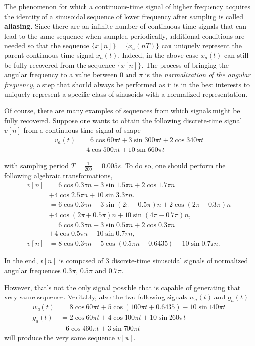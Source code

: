 \documentclass[\documentfontsize, twocolumn]{\classname}
\begin{document}
The phenomenon for which a con\-ti\-nuo\-us-time signal of high\-er frequency acquires the identity of a sinusoidal se\-quen\-ce of lower frequency after sampling is called \textbf{aliasing}. Since there are an infinite number of con\-ti\-nuo\-us-time signals that can lead to the same se\-quen\-ce when sampled periodically, additional conditions are needed so that the se\-quen\-ce $\{x[n]\} = \{x_a(nT)\}$ can uniquely represent the parent con\-ti\-nuo\-us-time signal $x_a(t)$. Indeed, in the above case $x_a(t)$ can still be fully recovered from the se\-quen\-ce $\{x[n]\}$. The process of bringing the angular frequency to a value between $0$ and $\pi$ is the \emph{normalization of the angular frequency}, a step that should always be performed as it is in the best interests to uniquely represent a specific class of sinusoids with a normalized representation.

Of course, there are many examples of se\-quen\-ces from which signals might be fully recovered. Suppose one wants to obtain the following discrete-time signal $v[n]$ from a con\-ti\-nuo\-us-time signal of shape 
\begin{align*}
v_a(t) &=6\cos{60\pi t} + 3\sin{300\pi t} + 2\cos{340\pi t} \\ & + 4\cos{500\pi t} + 10\sin{660\pi t}
\end{align*}

with sampling period $T = \frac 1 {200} = 0.005s$.
To do so, one should perform the following algebraic transformations,
\begin{align*}
    v[n] &= 6 \cos{0.3 \pi n} + 3 \sin{1.5 \pi n} + 2 \cos{1.7 \pi n} \\
         &+ 4 \cos{2.5 \pi n} + 10 \sin{3.3 \pi n},\\
         &= 6 \cos{0.3 \pi n} + 3 \sin{(2\pi -0.5 \pi) n} + 2 \cos{(2\pi - 0.3\pi)n} \\
         &+ 4 \cos{(2 \pi + 0.5\pi) n} + 10 \sin{(4 \pi - 0.7\pi) n},\\
         &= 6 \cos{0.3 \pi n} - 3 \sin{0.5 \pi n} + 2 \cos{0.3\pi n} \\
         &+ 4 \cos{0.5\pi n} - 10 \sin{0.7\pi n},\\
    v[n] &= 8 \cos{0.3 \pi n} + 5 \cos{(0.5 \pi n + 0.6435)} - 10 \sin{0.7\pi n}.
\end{align*}

In the end, $v[n]$ is composed of 3 discrete-time sinusoidal signals of normalized angular frequences $0.3\pi$, $0.5\pi$ and $0.7\pi$.

However, that's not the only signal possible that is capable of generating that very same sequence. Veritably, also the two following signals $w_a(t)$ and $g_a(t)$
\begin{align*}
    w_a(t) &= 8 \cos{60 \pi t} + 5\cos{(100 \pi t + 0.6435)} - 10\sin {140\pi t}\\
    g_a(t) &= 2 \cos{60 \pi t} + 4\cos{100 \pi t} + 10\sin {260\pi t}\\
           &+ 6\cos{460\pi t} + 3 \sin{700\pi t}
\end{align*}
will produce the very same sequence $v[n]$.
\end{document}
